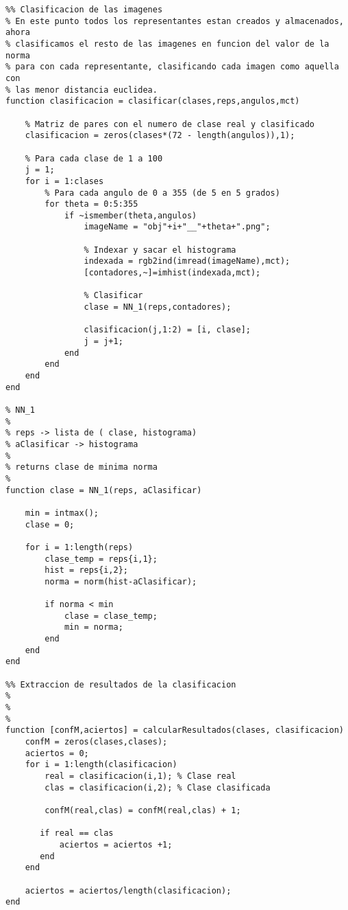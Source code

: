 \documentclass[es,gi]{ifirak}\usepackage[]{graphicx}\usepackage[]{color}
\begin{document}
\begin{lstlisting}
%% Clasificacion de las imagenes
% En este punto todos los representantes estan creados y almacenados, ahora
% clasificamos el resto de las imagenes en funcion del valor de la norma
% para con cada representante, clasificando cada imagen como aquella con
% las menor distancia euclidea.
function clasificacion = clasificar(clases,reps,angulos,mct)

    % Matriz de pares con el numero de clase real y clasificado
    clasificacion = zeros(clases*(72 - length(angulos)),1);
    
    % Para cada clase de 1 a 100
    j = 1;
    for i = 1:clases
        % Para cada angulo de 0 a 355 (de 5 en 5 grados)
        for theta = 0:5:355
            if ~ismember(theta,angulos)
                imageName = "obj"+i+"__"+theta+".png";

                % Indexar y sacar el histograma
                indexada = rgb2ind(imread(imageName),mct);
                [contadores,~]=imhist(indexada,mct);

                % Clasificar
                clase = NN_1(reps,contadores);

                clasificacion(j,1:2) = [i, clase];
                j = j+1;
            end
        end 
    end
end

% NN_1 
%   
% reps -> lista de ( clase, histograma)
% aClasificar -> histograma
%
% returns clase de minima norma
%
function clase = NN_1(reps, aClasificar)
    
    min = intmax();
    clase = 0;
    
    for i = 1:length(reps)
        clase_temp = reps{i,1};
        hist = reps{i,2};
        norma = norm(hist-aClasificar);
        
        if norma < min 
            clase = clase_temp;
            min = norma;
        end 
    end
end

%% Extraccion de resultados de la clasificacion 
%
%
%
function [confM,aciertos] = calcularResultados(clases, clasificacion)
    confM = zeros(clases,clases);
    aciertos = 0;
    for i = 1:length(clasificacion)
        real = clasificacion(i,1); % Clase real
        clas = clasificacion(i,2); % Clase clasificada
        
        confM(real,clas) = confM(real,clas) + 1;
        
       if real == clas 
           aciertos = aciertos +1;
       end
    end
    
    aciertos = aciertos/length(clasificacion);
end
\end{lstlisting}
\pagebreak
\end{document}
